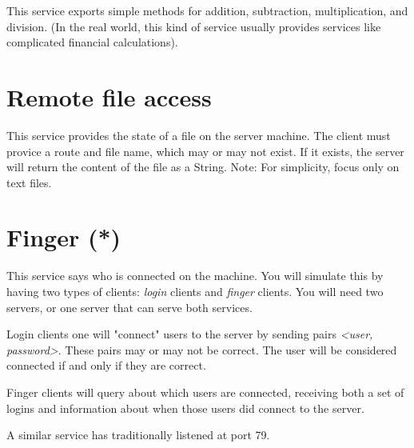 \documentclass{article}
\begin{document}
This service exports simple methods for addition, subtraction, multiplication, 
and division. (In the real world, this kind of service usually provides services
like complicated financial calculations). 

\section{Remote file access}
\label{sec:remote-file-access}

This service provides the state of a file on the server machine. The client must
provice a route and file name, which may or may not exist. If it exists, the 
server will return the content of the file as a String. Note: For simplicity, focus 
only on text files. 

\section{Finger (*)}
\label{sec:finger}

This service says who is connected on the machine. You will simulate
this by having two types of clients: \emph{login} clients and
\emph{finger} clients. You will need two servers, or one server that
can serve both services.

Login clients one will "connect" users to the server by sending pairs 
\emph{<user, password>}. These pairs may or may not be correct. The
user will be considered connected if and only if they are correct. 

Finger clients will query about which users are connected, receiving
both a set of logins and information about when those users did
connect to the server. 

A similar service has traditionally listened at port 79.
\end{document}
